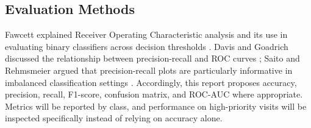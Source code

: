 \documentclass[12pt,a4paper,oneside]{report}
\begin{document}
\subsection{Evaluation Methods}
Fawcett explained Receiver Operating Characteristic analysis and its use in evaluating binary classifiers across decision thresholds \cite{fawcett2006}. Davis and Goadrich discussed the relationship between precision-recall and ROC curves \cite{davis2006}; Saito and Rehmsmeier argued that precision-recall plots are particularly informative in imbalanced classification settings \cite{saito2015}. Accordingly, this report proposes accuracy, precision, recall, F1-score, confusion matrix, and ROC-AUC where appropriate. Metrics will be reported by class, and performance on high-priority visits will be inspected specifically instead of relying on accuracy alone.
\end{document}
